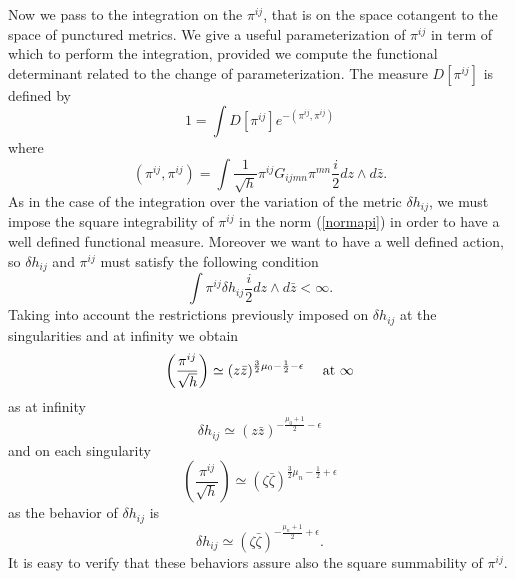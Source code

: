 \documentclass[a4paper,12pt]{article}
\begin{document}
Now we pass to the integration on the $\pi^{ij}$, that is on the
space cotangent to the space of punctured metrics. 
We give a useful parameterization of
$\pi^{ij}$ in term of which to perform the integration, provided we
compute the functional determinant related to the change of
parameterization.  The measure $D[\pi^{ij}]$ is defined by
\begin{equation}
1=\int D[\pi^{ij}] e^{-(\pi^{ij},\pi^{ij})}
\end{equation}
where 
\begin{equation}\label{normapi}
(\pi^{ij}, \pi^{ij})=\int \frac{1}{\sqrt h}  \pi^{ij} G_{ijmn}\pi^{mn} 
\frac{i}{2}dz\wedge d\bar z.
\end{equation}
As in the case of the integration over the variation of the metric
$\delta h_{ij}$, we must impose the square integrability of $\pi^{ij}$
in the norm (\ref{normapi}) in order to have a well defined functional
measure.  Moreover we want to have a well defined action, so $\delta
h_{ij}$ and $\pi^{ij}$ must satisfy the following condition
\begin{equation}
\int \pi^{ij} \delta h_{ij} \frac{i}{2} dz \wedge d\bar z < \infty.
\end{equation}
Taking into account the restrictions previously imposed on $\delta
h_{ij}$ at the singularities and at infinity we obtain
\begin{equation}
\left(\frac{\pi^{ij} }{\sqrt h}\right) \simeq (z \bar
z)^{\frac{3}{2}\mu_0 -\frac{1}{2}-\epsilon} ~~~~{\rm at}~\infty
\end{equation}
as at infinity
\begin{equation}
\delta h_{ij} \simeq (z \bar z)^{-\frac{\mu_0+1}{2} -\epsilon}
\end{equation}
and on each singularity
\begin{equation}
\left(\frac{\pi^{ij} }{\sqrt h}\right) \simeq 
(\zeta \bar \zeta)^{\frac{3}{2}\mu_n -\frac{1}{2}+\epsilon}
\end{equation}
as the behavior of $\delta h_{ij}$ is
\begin{equation}
\delta h_{ij} \simeq (\zeta \bar \zeta)^{-\frac{\mu_n+1}{2} +\epsilon}.
\end{equation}
It is easy to verify that these behaviors assure also the square
summability of $\pi^{ij}$.
\end{document}
